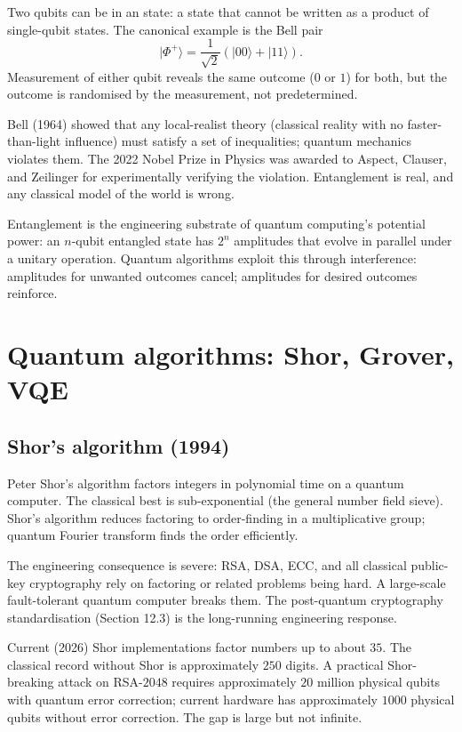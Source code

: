 Two qubits can be in an  state: a state that cannot be written as a product of single-qubit states. The canonical example is the Bell pair
\[
|\Phi^+\rangle = \frac{1}{\sqrt{2}}(|00\rangle + |11\rangle).
\]
Measurement of either qubit reveals the same outcome ($0$ or $1$) for both, but the outcome is randomised by the measurement, not predetermined.

Bell (1964) showed that any local-realist theory (classical reality with no faster-than-light influence) must satisfy a set of inequalities; quantum mechanics violates them. The 2022 Nobel Prize in Physics was awarded to Aspect, Clauser, and Zeilinger for experimentally verifying the violation. Entanglement is real, and any classical model of the world is wrong.

Entanglement is the engineering substrate of quantum computing's potential power: an $n$-qubit entangled state has $2^n$ amplitudes that evolve in parallel under a unitary operation. Quantum algorithms exploit this through interference: amplitudes for unwanted outcomes cancel; amplitudes for desired outcomes reinforce.

\section{Quantum algorithms: Shor, Grover, VQE}

\subsection{Shor's algorithm (1994)}

Peter Shor's algorithm factors integers in polynomial time on a quantum computer. The classical best is sub-exponential (the general number field sieve). Shor's algorithm reduces factoring to order-finding in a multiplicative group; quantum Fourier transform finds the order efficiently.

The engineering consequence is severe: RSA, DSA, ECC, and all classical public-key cryptography rely on factoring or related problems being hard. A large-scale fault-tolerant quantum computer breaks them. The post-quantum cryptography standardisation (Section 12.3) is the long-running engineering response.

Current (2026) Shor implementations factor numbers up to about $35$. The classical record without Shor is approximately $250$ digits. A practical Shor-breaking attack on RSA-$2048$ requires approximately $20$ million physical qubits with quantum error correction; current hardware has approximately $1000$ physical qubits without error correction. The gap is large but not infinite.

